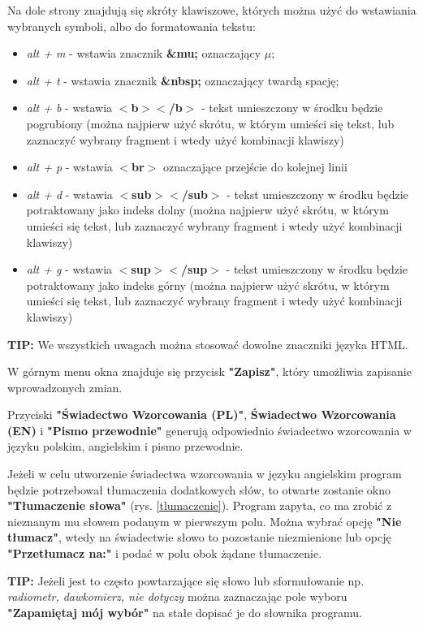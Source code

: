 	Na dole strony znajdują się skróty klawiszowe, których można użyć do wstawiania wybranych symboli, albo do formatowania tekstu:
	\begin{itemize}
		\item\textit{alt + m} - wstawia znacznik \textbf{\&mu;} oznaczający  $\mu$;
		\item\textit{alt + t} - wstawia znacznik \textbf{\&nbsp;} oznaczający twardą spację;
		\item\textit{alt + b} - wstawia \textbf{$<$b$>$$<$/b$>$} - tekst umieszczony w środku będzie pogrubiony (można najpierw użyć skrótu, w którym umieści się tekst, lub zaznaczyć wybrany fragment i wtedy użyć kombinacji klawiszy)
		\item\textit{alt + p} - wstawia \textbf{$<$br$>$} oznaczające przejście do kolejnej linii
		\item\textit{alt + d} - wstawia \textbf{$<$sub$>$$<$/sub$>$} - tekst umieszczony w środku będzie potraktowany jako indeks dolny (można najpierw użyć skrótu, w którym umieści się tekst, lub zaznaczyć wybrany fragment i wtedy użyć kombinacji klawiszy)
		\item\textit{alt + g} - wstawia \textbf{$<$sup$>$$<$/sup$>$} - tekst umieszczony w środku będzie potraktowany jako indeks górny (można najpierw użyć skrótu, w którym umieści się tekst, lub zaznaczyć wybrany fragment i wtedy użyć kombinacji klawiszy)
	\end{itemize}

	\textbf{TIP:} We wszystkich uwagach można stosować dowolne znaczniki języka HTML.

	W górnym menu okna znajduje się przycisk \textbf{"Zapisz"}, który umożliwia zapisanie wprowadzonych zmian.
	
	Przyciski \textbf{"Świadectwo Wzorcowania (PL)"}, \textbf{Świadectwo Wzorcowania (EN)} i \textbf{"Pismo przewodnie"} generują odpowiednio świadectwo wzorcowania w języku polskim, angielskim i pismo przewodnie.
	
	Jeżeli w celu utworzenie świadectwa wzorcowania w języku angielskim program będzie potrzebował tłumaczenia dodatkowych słów, to otwarte zostanie okno \textbf{"Tłumaczenie słowa"} (rys. \ref{tlumaczenie}).
	Program zapyta, co ma zrobić z nieznanym mu słowem podanym w pierwszym polu. Można wybrać opcję \textbf{"Nie tłumacz"}, wtedy na świadectwie słowo to pozostanie niezmienione lub opcję \textbf{"Przetłumacz na:"} i podać w polu obok żądane tłumaczenie. 
	
	\textbf{TIP:} Jeżeli jest to często powtarzające się słowo lub sformułowanie  np. \textit{radiometr, dawkomierz, nie dotyczy} można zaznaczając pole wyboru \textbf{"Zapamiętaj mój wybór"} na stałe dopisać je do słownika programu.

